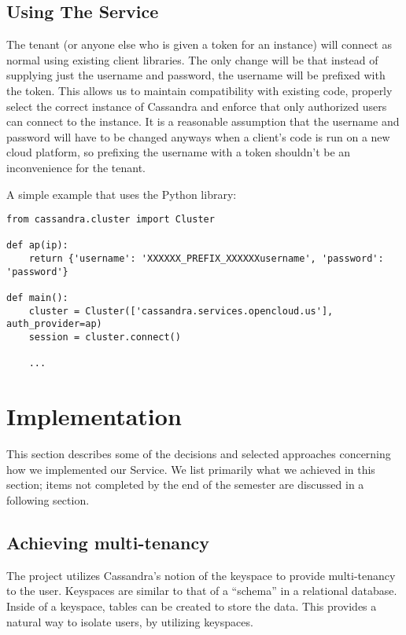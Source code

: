 \documentclass[11pt,notitlepage]{report}
\begin{document}
\section*{Using The Service}

The tenant (or anyone else who is given a token for an instance) will connect as normal using existing client libraries. The only change will be that instead of supplying just the username and password, the username will be prefixed with the token. This allows us to maintain compatibility with existing code, properly select the correct instance of Cassandra and enforce that only authorized users can connect to the instance. It is a reasonable assumption that the username and password will have to be changed anyways when a client's code is run on a new cloud platform, so prefixing the username with a token shouldn't be an inconvenience for the tenant.

A simple example that uses the Python library:

\lstset{language=Python,showspaces=false,showstringspaces=false,basicstyle=\footnotesize}
\begin{lstlisting}
from cassandra.cluster import Cluster

def ap(ip):
    return {'username': 'XXXXXX_PREFIX_XXXXXXusername', 'password': 'password'}

def main():
    cluster = Cluster(['cassandra.services.opencloud.us'], auth_provider=ap)
    session = cluster.connect()

    ...
\end{lstlisting}

\chapter*{Implementation}

This section describes some of the decisions and selected approaches concerning how we implemented our Service. We list primarily what we achieved in this section; items not completed by the end of the semester are discussed in a following section.


\section*{Achieving multi-tenancy}

The project utilizes Cassandra's notion of the keyspace to provide multi-tenancy to the user. Keyspaces are similar to that of a ``schema'' in a relational database. Inside of a keyspace, tables can be created to store the data. This provides a natural way to isolate users, by utilizing keyspaces.
\end{document}
